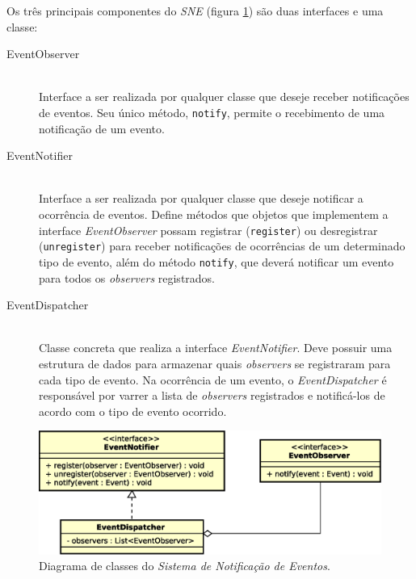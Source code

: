 Os três principais componentes do \textit{SNE} (figura
\ref{fig:diagram:notification}) são duas interfaces e uma classe:

\begin{description}
  \item[EventObserver] \hfill \\
    Interface a ser realizada por qualquer classe que deseje receber
    notificações de eventos. Seu único método, \texttt{notify}, permite o
    recebimento de uma notificação de um evento.

  \item[EventNotifier] \hfill \\
    Interface a ser realizada por qualquer classe que deseje notificar a
    ocorrência de eventos. Define métodos que objetos que implementem a
    interface \textit{EventObserver} possam registrar (\texttt{register}) ou
    desregistrar (\texttt{unregister}) para receber notificações de ocorrências
    de um determinado tipo de evento, além do método \texttt{notify}, que deverá
    notificar um evento para todos os \textit{observers} registrados.

\item[EventDispatcher] \hfill \\
    Classe concreta que realiza a interface \textit{EventNotifier}. Deve possuir
    uma estrutura de dados para armazenar quais \textit{observers} se
    registraram para cada tipo de evento. Na ocorrência de um evento, o
    \textit{EventDispatcher} é responsável por varrer a lista de
    \textit{observers} registrados e notificá-los de acordo com o tipo de evento
    ocorrido.

\end{description}

\begin{figure}[htb!]
  \centering
  \includegraphics[scale=0.6]{img/Notification.eps}
  \caption{Diagrama de classes do \textit{Sistema de Notificação de Eventos}.}
\label{fig:diagram:notification}
\end{figure}

